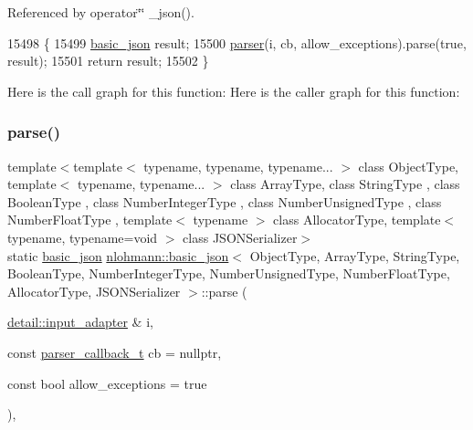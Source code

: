 Referenced by operator\char`\"{}\char`\"{} \+\_\+json().


\begin{DoxyCode}
15498     \{
15499         \hyperlink{classnlohmann_1_1basic__json_aed115142bd0c6c66c864700e0467df55}{basic\_json} result;
15500         \hyperlink{classnlohmann_1_1basic__json_aba9704e82d18f8954f9925e26cec7a51}{parser}(i, cb, allow\_exceptions).parse(\textcolor{keyword}{true}, result);
15501         \textcolor{keywordflow}{return} result;
15502     \}
\end{DoxyCode}
Here is the call graph for this function\+:
Here is the caller graph for this function\+:
\mbox{\label{classnlohmann_1_1basic__json_af3501e04d3c7a824bffb05a5a45ba884}} 
\subsubsection{\texorpdfstring{parse()}{parse()}\hspace{0.1cm}{\footnotesize\ttfamily [2/3]}}
{\footnotesize\ttfamily template$<$template$<$ typename, typename, typename... $>$ class Object\+Type, template$<$ typename, typename... $>$ class Array\+Type, class String\+Type , class Boolean\+Type , class Number\+Integer\+Type , class Number\+Unsigned\+Type , class Number\+Float\+Type , template$<$ typename $>$ class Allocator\+Type, template$<$ typename, typename=void $>$ class J\+S\+O\+N\+Serializer$>$ \\
static \hyperlink{classnlohmann_1_1basic__json}{basic\+\_\+json} \hyperlink{classnlohmann_1_1basic__json}{nlohmann\+::basic\+\_\+json}$<$ Object\+Type, Array\+Type, String\+Type, Boolean\+Type, Number\+Integer\+Type, Number\+Unsigned\+Type, Number\+Float\+Type, Allocator\+Type, J\+S\+O\+N\+Serializer $>$\+::parse (\begin{DoxyParamCaption}\item[{\hyperlink{classnlohmann_1_1detail_1_1input__adapter}{detail\+::input\+\_\+adapter} \&}]{i,  }\item[{const \hyperlink{classnlohmann_1_1basic__json_ab4f78c5f9fd25172eeec84482e03f5b7}{parser\+\_\+callback\+\_\+t}}]{cb = {\ttfamily nullptr},  }\item[{const bool}]{allow\+\_\+exceptions = {\ttfamily true} }\end{DoxyParamCaption})\hspace{0.3cm}{\ttfamily [inline]}, {\ttfamily [static]}}



